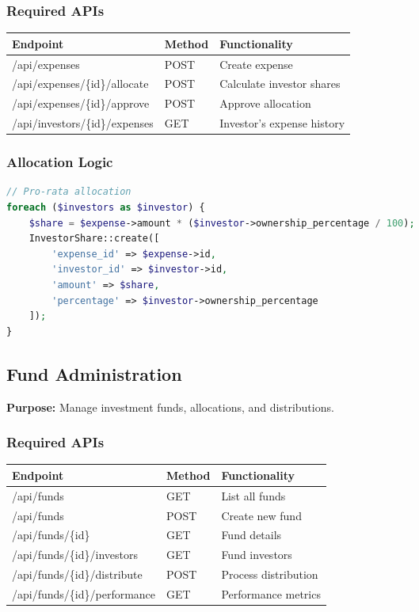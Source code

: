 \documentclass[11pt,a4paper]{article}
\begin{document}
\subsubsection{Required APIs}

\begin{longtable}{|p{5cm}|p{2cm}|p{6cm}|}
\hline
\textbf{Endpoint} & \textbf{Method} & \textbf{Functionality} \\
\hline
/api/expenses & POST & Create expense \\
/api/expenses/\{id\}/allocate & POST & Calculate investor shares \\
/api/expenses/\{id\}/approve & POST & Approve allocation \\
/api/investors/\{id\}/expenses & GET & Investor's expense history \\
\hline
\end{longtable}

\subsubsection{Allocation Logic}
\begin{lstlisting}[language=php]
// Pro-rata allocation
foreach ($investors as $investor) {
    $share = $expense->amount * ($investor->ownership_percentage / 100);
    InvestorShare::create([
        'expense_id' => $expense->id,
        'investor_id' => $investor->id,
        'amount' => $share,
        'percentage' => $investor->ownership_percentage
    ]);
}
\end{lstlisting}

\subsection{Fund Administration}

\textbf{Purpose:} Manage investment funds, allocations, and distributions.

\subsubsection{Required APIs}

\begin{longtable}{|p{5cm}|p{2cm}|p{6cm}|}
\hline
\textbf{Endpoint} & \textbf{Method} & \textbf{Functionality} \\
\hline
/api/funds & GET & List all funds \\
/api/funds & POST & Create new fund \\
/api/funds/\{id\} & GET & Fund details \\
/api/funds/\{id\}/investors & GET & Fund investors \\
/api/funds/\{id\}/distribute & POST & Process distribution \\
/api/funds/\{id\}/performance & GET & Performance metrics \\
\hline
\end{longtable}
\end{document}
